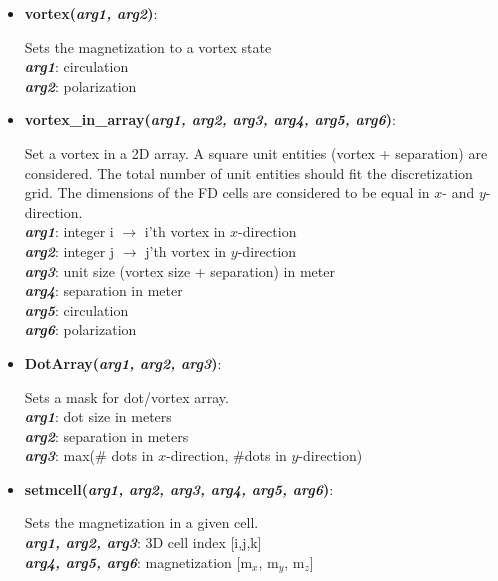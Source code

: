 \begin{itemize}
 \item {\vspace{-0.4cm}\textbf{vortex(\textit{arg1, arg2})}:
				\flushright\parbox{0.9 \textwidth}{\vspace{-0.25cm} 
				Sets the magnetization to a vortex state\\
				\textbf{\textit{arg1}}: circulation\\
				\textbf{\textit{arg2}}: polarization
				}\flushleft}

 \item {\vspace{-0.4cm}\textbf{vortex\_in\_array(\textit{arg1, arg2, arg3, arg4, arg5, arg6})}:
				\flushright\parbox{0.9 \textwidth}{\vspace{-0.25cm} 
				Set a vortex in a 2D array. A square unit entities (vortex + separation) are considered.  The total number of unit entities should fit the discretization grid.  The dimensions of the FD cells are considered to be equal in $x$- and $y$-direction.\\
				\textbf{\textit{arg1}}: integer i $\rightarrow$ i'th vortex in $x$-direction\\
				\textbf{\textit{arg2}}: integer j $\rightarrow$ j'th vortex in $y$-direction\\
				\textbf{\textit{arg3}}: unit size (vortex size + separation) in meter \\
				\textbf{\textit{arg4}}: separation in meter\\
				\textbf{\textit{arg5}}: circulation\\
				\textbf{\textit{arg6}}: polarization
				}\flushleft}

 \item {\vspace{-0.4cm}\textbf{DotArray(\textit{arg1, arg2, arg3})}:
				\flushright\parbox{0.9 \textwidth}{\vspace{-0.25cm} 
				Sets a mask for dot/vortex array.\\
				\textbf{\textit{arg1}}: dot size in meters\\
				\textbf{\textit{arg2}}: separation in meters\\
				\textbf{\textit{arg3}}: max(\# dots in $x$-direction, \#dots in $y$-direction)
				}\flushleft}

 \item {\vspace{-0.4cm}\textbf{setmcell(\textit{arg1, arg2, arg3, arg4, arg5, arg6})}:
				\flushright\parbox{0.9 \textwidth}{\vspace{-0.25cm} 
				Sets the magnetization in a given cell.\\
				\textbf{\textit{arg1, arg2, arg3}}: 3D cell index [i,j,k]\\
				\textbf{\textit{arg4, arg5, arg6}}: magnetization [m$_x$, m$_y$, m$_z$]
				}\flushleft}


\end{itemize}
